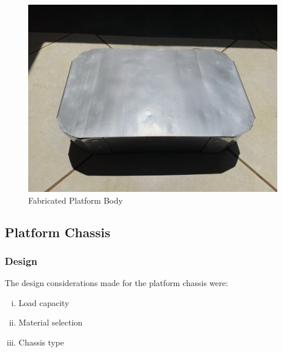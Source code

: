 \begin{figure}[H]
    \includegraphics[scale = 0.1]{Figures/bodyFABRICATEDtop.jpg}
    \caption{Fabricated Platform Body}
    \label{fig:fabPlatf}
\end{figure}

\subsection{Platform Chassis}
\subsubsection{Design}
The design considerations made for the platform chassis were:
\begin{enumerate}[i.]
    \item Load capacity
    \item Material selection
    \item Chassis type
\end{enumerate}

